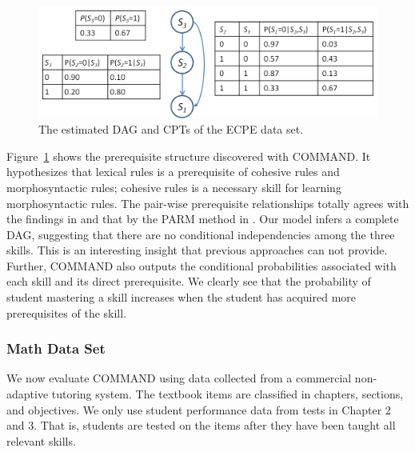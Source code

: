 \documentclass{edm_template}
\begin{document}
				\begin{figure}[!th]
					\begin{center}
						\centering
						\includegraphics[width=0.95\linewidth]{figures/ecpe_results.png}
					\end{center}
					\vspace{-1em}
					\caption{%
						The estimated DAG and CPTs of the ECPE data set.}
					\label{fig:ecpe-result} 
				\end{figure}
					 				
	Figure~\ref{fig:ecpe-result} shows the prerequisite structure discovered with COMMAND. %
	It hypothesizes that lexical rules is a prerequisite of cohesive rules and morphosyntactic rules; 
	cohesive rules is a necessary skill for learning morphosyntactic rules. 
	The pair-wise prerequisite relationships totally agrees with the findings in \cite{templin2014hierarchical} and that by the PARM method in \cite{chen2015discovering}.
	Our model infers a complete DAG, suggesting that there are no conditional independencies among the three skills.
	This is an interesting insight that previous approaches can not provide.   
	Further, COMMAND also outputs the conditional probabilities associated with each skill and its direct prerequisite.
	We clearly see that the probability of student mastering a skill increases when the student has acquired more prerequisites of the skill.
	
	
	\subsubsection{Math Data Set}
	We now evaluate COMMAND using data collected from a commercial non-adaptive tutoring system.
	The textbook items are classified in chapters, sections, and objectives.
	We only use  student performance data from tests in Chapter 2 and  3.
	That is, students are tested on the items after they have been taught all relevant skills.
	
\end{document}

